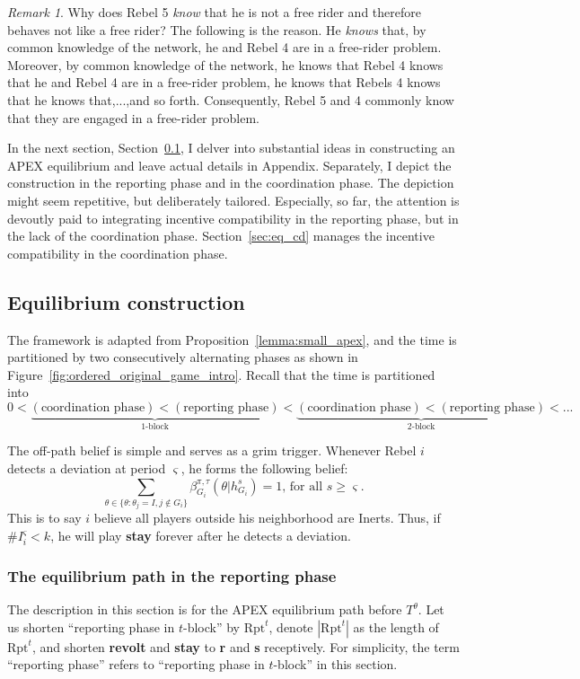 \documentclass[12pt,letter]{article}
\newcommand{\Omicron}{\mathrm{Rpt}}
\theoremstyle{definition}
\theoremstyle{remark}
\newtheorem*{remark}{Remark}
\theoremstyle{claim}
\begin{document}
\begin{remark}
Why does Rebel 5 \textit{know} that he is not a free rider and therefore behaves not like a free rider? The following is the reason. He \textit{knows} that, by common knowledge of the network, he and Rebel 4 are in a free-rider problem. Moreover, by common knowledge of the network, he knows that Rebel 4 knows that he and Rebel 4 are in a free-rider problem, he knows that Rebels 4 knows that he knows that,...,and so forth. Consequently, Rebel 5 and 4 commonly know that they are engaged in a free-rider problem. 
\end{remark}
In the next section, Section~\ref{sec:dis_writing}, I delver into substantial ideas in constructing an APEX equilibrium and leave actual details in Appendix. Separately, I depict the construction in the reporting phase and in the coordination phase. The depiction might seem repetitive, but deliberately tailored. Especially, so far, the attention is devoutly paid to integrating incentive compatibility in the reporting phase, but in the lack of the coordination phase. Section~\ref{sec:eq_cd} manages the incentive compatibility in the coordination phase.
\subsection{Equilibrium construction}
\label{sec:dis_writing}
The framework is adapted from Proposition~\ref{lemma:small_apex}, and the time is partitioned by two consecutively alternating phases as shown in Figure~\ref{fig:ordered_original_game_intro}. Recall that the time is partitioned into
\[0<\underbrace{(\text{coordination phase})<(\text{reporting phase})}_{\text{$1$-block}}<\underbrace{(\text{coordination phase})<(\text{reporting phase})}_{\text{$2$-block}}<...\]

The off-path belief is simple and serves as a grim trigger. Whenever Rebel $i$ detects a deviation at period $\varsigma$, he forms the following belief: 
\begin{equation}
\label{eq_grim_trigger}
\sum_{\theta \in \{\theta:\theta_j=I,j\notin G_i\}}\beta^{\pi,\tau}_{G_i}({\theta}|h^{s}_{G_i})=1 \text{, for all $s\geq \varsigma$}.
\end{equation}
This is to say $i$ believe all players outside his neighborhood are Inerts. Thus, if $\# I^{\varsigma}_i<k$, he will play \textbf{stay} forever after he detects a deviation. 

\subsubsection{The equilibrium path in the reporting phase}
\label{sec:eq_rp}
The description in this section is for the APEX equilibrium path {before} $T^{\theta}$. Let us shorten ``reporting phase in $t$-block'' by $\Omicron^{t}$, denote $|\Omicron^t|$ as the length of $\Omicron^{t}$, and shorten \textbf{revolt} and \textbf{stay} to \textbf{r} and \textbf{s} receptively. For simplicity, the term ``reporting phase'' refers to ``reporting phase in $t$-block'' in this section.
\end{document}
